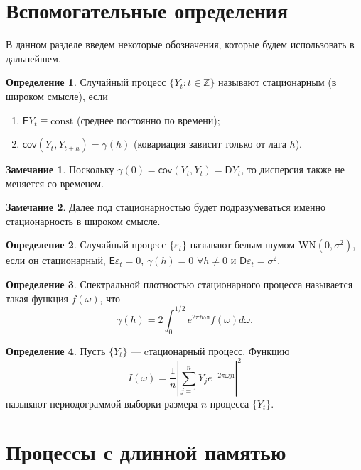 \documentclass[specialist,
substylefile = spbu_report.rtx,
subf,href,colorlinks=true, 12pt]{disser}
\theoremstyle{definition}
\newtheorem{definition}{Определение}[section]
\newtheorem{remark}{Замечание}[section]
\newcommand{\Z}{\mathbb{Z}}
\newcommand{\const}{\mathrm{const}}
\newcommand{\im}{\mathrm{i}}
\begin{document}
\section{Вспомогательные определения}
В данном разделе введем некоторые обозначения, которые будем использовать в дальнейшем.
\begin{definition}\label{def:stationary}
	Случайный процесс $\{Y_t:t\in\Z\}$ называют стационарным (в широком смысле), если
	\begin{enumerate}
		\item $\mathsf{E}Y_t\equiv\const$ (среднее постоянно по времени);
		\item $\mathsf{cov}(Y_t,Y_{t+h})=\gamma(h)$ (ковариация зависит только от лага $h$).
	\end{enumerate}
\end{definition}
\begin{remark}
	Поскольку $\gamma(0)=\mathsf{cov}(Y_t,Y_t)=\mathsf{D}Y_t$, то дисперсия также не меняется со временем.
\end{remark}
\begin{remark}
	Далее под стационарностью будет подразумеваться именно стационарность в широком смысле.
\end{remark}
\begin{definition}
	Случайный процесс $\{\varepsilon_t\}$ называют белым шумом $\mathrm{WN}(0, \sigma^2)$, если он стационарный, $\mathsf{E}\varepsilon_t=0$, $\gamma(h)=0$ $\forall h\ne 0$ и $\mathsf{D}\varepsilon_t=\sigma^2$.
\end{definition}
\begin{definition}
	Спектральной плотностью стационарного процесса называется такая функция $f(\omega)$, что
	\[
		\gamma(h)=2\int_{0}^{1/2} e^{2\pi h\omega\im}f(\omega)d\omega.
	\]
\end{definition}
\begin{definition}
	Пусть $\{Y_t\}$ --- cтационарный процесс. Функцию
	\[
		I(\omega)=\frac1n\left|\sum_{j=1}^{n} Y_je^{-2\pi \omega j\mathrm{i}}\right|^2
	\]
	называют периодограммой выборки размера $n$ процесса $\{Y_t\}$.
\end{definition}

\section{Процессы с длинной памятью}
\end{document}
